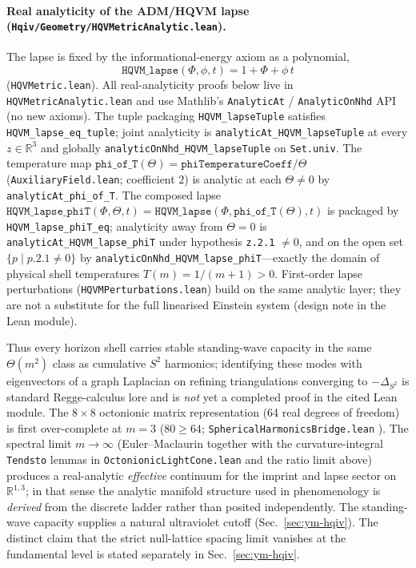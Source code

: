 \documentclass[12pt,a4paper]{article}
\begin{document}
\paragraph{Real analyticity of the ADM/HQVM lapse (\texttt{Hqiv/Geometry/HQVMetricAnalytic.lean}).}
The lapse is fixed by the informational-energy axiom as a polynomial,
\[
\texttt{HQVM\_lapse}(\Phi,\phi,t) = 1 + \Phi + \phi\, t
\]
(\texttt{HQVMetric.lean}). All real-analyticity proofs below live in \texttt{HQVMetricAnalytic.lean} \citep{hqiv-lean} and use Mathlib’s \texttt{AnalyticAt} / \texttt{AnalyticOnNhd} API (no new axioms). The tuple packaging \texttt{HQVM\_lapseTuple} satisfies \texttt{HQVM\_lapse\_eq\_tuple}; joint analyticity is \texttt{analyticAt\_HQVM\_lapseTuple} at every \(z \in \mathbb{R}^3\) and globally \texttt{analyticOnNhd\_HQVM\_lapseTuple} on \texttt{Set.univ}. The temperature map \(\texttt{phi\_of\_T}(\Theta)=\texttt{phiTemperatureCoeff}/\Theta\) (\texttt{AuxiliaryField.lean}; coefficient \(2\)) is analytic at each \(\Theta\neq 0\) by \texttt{analyticAt\_phi\_of\_T}. The composed lapse \(\texttt{HQVM\_lapse\_phiT}(\Phi,\Theta,t)=\texttt{HQVM\_lapse}(\Phi,\texttt{phi\_of\_T}(\Theta),t)\) is packaged by \texttt{HQVM\_lapse\_phiT\_eq}; analyticity away from \(\Theta=0\) is \texttt{analyticAt\_HQVM\_lapse\_phiT} under hypothesis \texttt{z.2.1} \(\neq 0\), and on the open set \(\{p \mid p.2.1 \neq 0\}\) by \texttt{analyticOnNhd\_HQVM\_lapse\_phiT}---exactly the domain of physical shell temperatures \(T(m)=1/(m+1)>0\). First-order lapse perturbations (\texttt{HQVMPerturbations.lean}) build on the same analytic layer; they are not a substitute for the full linearised Einstein system (design note in the Lean module).

Thus every horizon shell carries stable standing-wave capacity in the same \(\Theta(m^2)\) class as cumulative \(S^2\) harmonics; identifying these modes with eigenvectors of a graph Laplacian on refining triangulations converging to \(-\Delta_{S^2}\) is standard Regge-calculus lore and is \emph{not} yet a completed proof in the cited Lean module. The \(8\times8\) octonionic matrix representation (64 real degrees of freedom) is first over-complete at \(m=3\) (\(80\ge 64\); \texttt{SphericalHarmonicsBridge.lean} \citep{hqiv-lean}). The spectral limit \(m\to\infty\) (Euler--Maclaurin together with the curvature-integral \texttt{Tendsto} lemmas in \texttt{OctonionicLightCone.lean} and the ratio limit above) produces a real-analytic \emph{effective} continuum for the imprint and lapse sector on \(\mathbb{R}^{1,3}\); in that sense the analytic manifold structure used in phenomenology is \emph{derived} from the discrete ladder rather than posited independently. The standing-wave capacity supplies a natural ultraviolet cutoff (Sec.~\ref{sec:ym-hqiv}). The distinct claim that the strict null-lattice spacing limit vanishes at the fundamental level is stated separately in Sec.~\ref{sec:ym-hqiv}.
\end{document}
